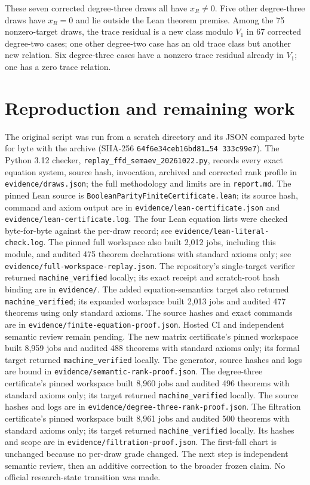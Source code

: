 \documentclass[10pt]{article}
\begin{document}
These seven corrected degree-three draws all have $x_R\ne0$. Five other
degree-three draws have $x_R=0$ and lie outside the Lean theorem premise. Among
the 75 nonzero-target draws, the trace residual is a new class modulo $V_1$
in 67 corrected degree-two cases; one other degree-two case has an old trace
class but another new relation. Six degree-three cases have a nonzero trace
residual already in $V_1$; one has a zero trace relation.

\section*{Reproduction and remaining work}
The original script was run from a scratch directory and its JSON compared
byte for byte with the archive (SHA-256
\texttt{64f6e34ceb16bd81\ldots54\,333c99e7}). The Python 3.12 checker,
\texttt{replay\_ffd\_semaev\_20261022.py}, records every exact equation
system, source hash, invocation, archived and corrected rank profile in
\texttt{evidence/draws.json}; the full methodology and limits are in
\texttt{report.md}. The pinned Lean source is
\texttt{BooleanParityFiniteCertificate.lean}; its source hash, command and
axiom output are in \texttt{evidence/lean-certificate.json} and
\texttt{evidence/lean-certificate.log}.
The four Lean equation lists were checked byte-for-byte against the per-draw
record; see \texttt{evidence/lean-literal-check.log}. The pinned full workspace
also built 2,012 jobs, including this
module, and audited 475 theorem declarations with standard axioms only;
see \texttt{evidence/full-workspace-replay.json}.
The repository's single-target verifier returned \texttt{machine\_verified}
locally; its exact receipt and scratch-root hash binding are in
\texttt{evidence/}. The added equation-semantics target also returned
\texttt{machine\_verified}; its expanded workspace built 2,013 jobs and
audited 477 theorems using only standard axioms. The source hashes and exact
commands are in \texttt{evidence/finite-equation-proof.json}. Hosted CI and
independent semantic review remain pending. The new matrix certificate's
pinned workspace built 8,959 jobs and audited 488 theorems with standard
axioms only; its formal target returned \texttt{machine\_verified} locally.
The generator, source hashes and logs are bound in
\texttt{evidence/semantic-rank-proof.json}. The degree-three certificate's
pinned workspace built 8,960 jobs and audited 496 theorems with standard
axioms only; its target returned \texttt{machine\_verified} locally. The
source hashes and logs are in \texttt{evidence/degree-three-rank-proof.json}.
The filtration certificate's pinned workspace built 8,961 jobs and audited
500 theorems with standard axioms only; its target returned
\texttt{machine\_verified} locally. Its hashes and scope are in
\texttt{evidence/filtration-proof.json}. The first-fall chart is unchanged
because no per-draw grade changed. The next step is independent semantic
review, then an additive correction to the broader frozen claim.
No official research-state transition was made.
\end{document}
